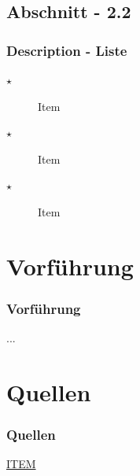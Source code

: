 \documentclass[xcolor=dvipsnames]{beamer}
\begin{document}
	\subsection{Abschnitt - 2.2}
		\begin{frame}
			\frametitle{Description - Liste}
			\begin{description}
				\item[$\star$] Item
				\item[$\star$] Item
				\item[$\star$] Item
			\end{description}
		\end{frame}


\section{Vorf\"uhrung}
	\begin{frame}
	  \frametitle{Vorf\"uhrung}
	  ...
	\end{frame}


\section{Quellen}
  \begin{frame}
    \frametitle{Quellen}
    
    \begin{thebibliography}{} 
      \href{http://www.google.com/}
      {ITEM}
    \end{thebibliography} 
  \end{frame}
\end{document}
